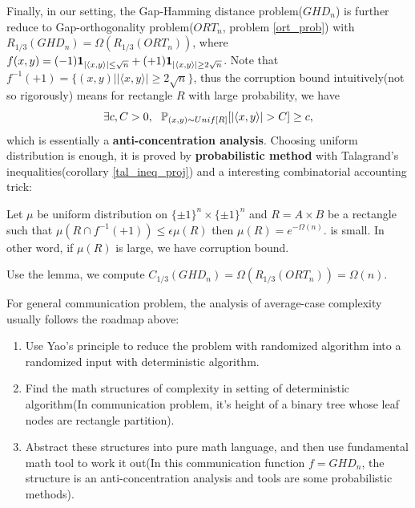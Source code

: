 {Finally, in our setting, the Gap-Hamming distance problem($GHD_n$) is further reduce to Gap-orthogonality problem($ORT_n$, problem \ref{ort_prob}) with $R_{1/3}(GHD_n)=\Omega(R_{1/3}(ORT_n))$, where $f(x,y)=(-1)\mathbf{1}_{|\langle x,y \rangle|\le\sqrt{n}}+(+1)\mathbf{1}_{|\langle x,y \rangle|\ge2\sqrt{n}}$. 
Note that $f^{-1}(+1)=\{(x,y)||\langle x,y \rangle|\ge2\sqrt{n}\}$, thus the corruption bound intuitively(not so rigorously) means for rectangle $R$ with large probability, we have
\begin{equation}
    \label{anti_concen_ghd}
    \exists c,C>0,~~\mb P_{(x,y)\sim Unif[R]}[|\langle x,y \rangle|>C]\ge c,
\end{equation}
which is essentially a \textbf{anti-concentration analysis}. Choosing uniform distribution is enough, it is proved by \textbf{probabilistic method} with Talagrand's inequalities(corollary \ref{tal_ineq_proj}) and a interesting combinatorial accounting trick:
\begin{lem}
\label{cor_bound}
Let $\mu$ be uniform distribution on $\{\pm1\}^n\times\{\pm1\}^n$ and $R=A\times B$ be a rectangle such that $\mu(R\cap f^{-1}(+1))\le \epsilon\mu(R)$ then $\mu(R)=e^{-\Omega(n)}.$ is small. In other word, if $\mu(R)$ is large, we have corruption bound.
\end{lem}
\noindent Use the lemma, we compute $C_{1/3}(GHD_n)=\Omega(R_{1/3}(ORT_n))=\Omega(n)$.
}

\begin{rmk}
For general communication problem, the analysis of average-case complexity usually follows the roadmap above:
\begin{enumerate}
    \item Use Yao's principle to reduce the problem with randomized algorithm into a randomized input with deterministic algorithm.
    \item Find the math structures of complexity in setting of deterministic algorithm(In communication problem, it's height of a binary tree whose leaf nodes are rectangle partition).
    \item Abstract these structures into pure math language, and then use fundamental math tool to work it out(In this communication function $f=GHD_n$, the structure is an anti-concentration analysis and tools are some probabilistic methods).
\end{enumerate}
\end{rmk}

